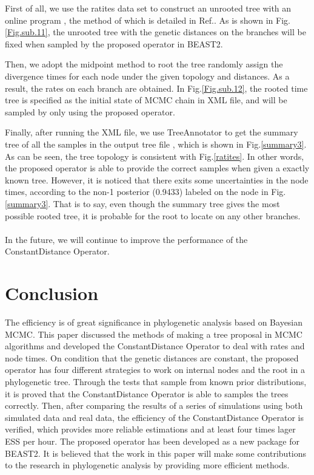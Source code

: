 \documentclass{bmcart}
\begin{document}
First of all, we use the ratites data set to construct an unrooted tree with an online program \cite{phyml}, the method of which is detailed in Ref.\cite{guindon2010new}.  As is shown in Fig.\ref{Fig.sub.11}, the unrooted tree with the genetic distances on the branches will be fixed when sampled by the proposed operator in BEAST2. 

Then, we adopt the midpoint method to root the tree randomly assign the divergence times for each node under the given topology and distances. As a result, the rates on each branch are obtained. In Fig.\ref{Fig.sub.12}, the rooted time tree is specified as the initial state of MCMC chain in XML file, and will be sampled by only using the proposed operator.

Finally, after running the XML file, we use TreeAnnotator to get the summary tree of all the samples in the output tree file \cite{TreeAnnotator}, which is shown in Fig.\ref{summary3}. As can be seen, the tree topology is consistent with Fig.\ref{ratites}. In other words, the proposed operator is able to provide the correct samples when given a exactly known tree.
However, it is noticed that there exits some uncertainties in the node times, according to the non-1 posterior (0.9433) labeled on the node in Fig.\ref{summary3}. That is to say, even though the summary tree gives the most possible rooted tree, it is probable for the root to locate on any other branches.
\\
\\
In the future, we will continue to improve the performance of the ConstantDistance Operator. 
\section*{Conclusion}
The efficiency is of great significance in phylogenetic analysis based on Bayesian MCMC. This paper discussed the methods of making a tree proposal in MCMC algorithms and developed the ConstantDistance Operator to deal with rates and node times. On condition that the genetic distances are constant, the proposed operator has four different strategies to work on internal nodes and the root in a phylogenetic tree. Through the tests that sample from known prior distributions, it is proved that the ConstantDistance Operator is able to samples the trees correctly. Then, after comparing the results of a series of simulations using both simulated data and real data, the efficiency of the ConstantDistance Operator is verified, which provides more reliable estimations and at least four times lager ESS per hour.  The proposed operator has been developed as a new package for BEAST2. It is believed that the work in this paper will make some contributions to the research in phylogenetic analysis by providing more efficient methods.
\end{document}
